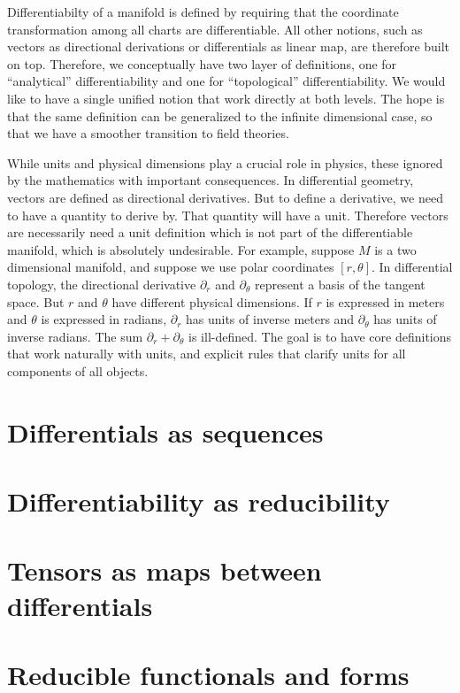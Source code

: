 \documentclass[10pt,twocolumn, nofootinbib]{revtex4-2}
\begin{document}
Differentiabilty of a manifold is defined by requiring that the coordinate transformation among all charts are differentiable. All other notions, such as vectors as directional derivations or differentials as linear map, are therefore built on top. Therefore, we conceptually have two layer of definitions, one for ``analytical'' differentiability and one for ``topological'' differentiability. We would like to have a single unified notion that work directly at both levels. The hope is that the same definition can be generalized to the infinite dimensional case, so that we have a smoother transition to field theories.

While units and physical dimensions play a crucial role in physics, these ignored by the mathematics with important consequences. In differential geometry, vectors are defined as directional derivatives. But to define a derivative, we need to have a quantity to derive by. That quantity will have a unit. Therefore vectors are necessarily need a unit definition which is not part of the differentiable manifold, which is absolutely undesirable. For example, suppose $M$ is a two dimensional manifold, and suppose we use polar coordinates $[r, \theta]$. In differential topology, the directional derivative $\partial_r$  and $\partial_\theta$ represent a basis of the tangent space. But $r$ and $\theta$ have different physical dimensions. If $r$ is expressed in meters and $\theta$ is expressed in radians, $\partial_r$ has units of inverse meters and $\partial_\theta$ has units of inverse radians. The sum $\partial_r + \partial_\theta$ is ill-defined. The goal is to have core definitions that work naturally with units, and explicit rules that clarify units for all components of all objects.

\section{Differentials as sequences}

\section{Differentiability as reducibility}

\section{Tensors as maps between differentials}

\section{Reducible functionals and forms}


\end{document}
